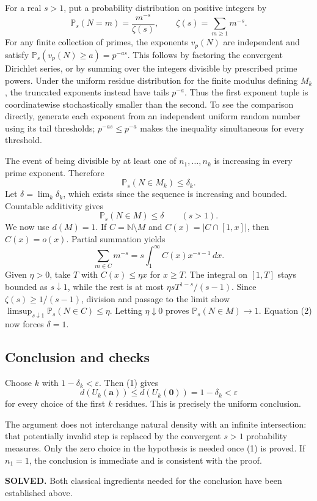 For a real $s>1$, put a probability distribution on positive integers by
\[
 \mathbb P_s(N=m)=\frac{m^{-s}}{\zeta(s)},
 \qquad \zeta(s)=\sum_{m\ge1}m^{-s}.
\]
For any finite collection of primes, the exponents $v_p(N)$ are independent and satisfy
$\mathbb P_s(v_p(N)\ge a)=p^{-as}$. This follows by factoring the convergent Dirichlet series, or by summing over the integers divisible by prescribed prime powers. Under the uniform residue distribution for the finite modulus defining $M_k$, the truncated exponents instead have tails $p^{-a}$. Thus the first exponent tuple is coordinatewise stochastically smaller than the second. To see the comparison directly, generate each exponent from an independent uniform random number using its tail thresholds; $p^{-as}\le p^{-a}$ makes the inequality simultaneous for every threshold.

The event of being divisible by at least one of $n_1,\ldots,n_k$ is increasing in every prime exponent. Therefore
\[
 \mathbb P_s(N\in M_k)\le\delta_k.
\]
Let $\delta=\lim_k\delta_k$, which exists since the sequence is increasing and bounded. Countable additivity gives
\[
 \mathbb P_s(N\in M)\le\delta \qquad(s>1).
 \tag{2}
\]
We now use $d(M)=1$. If $C=\mathbb N\setminus M$ and $C(x)=|C\cap[1,x]|$, then $C(x)=o(x)$. Partial summation yields
\[
 \sum_{m\in C}m^{-s}=s\int_1^\infty C(x)x^{-s-1}\,dx.
\]
Given $\eta>0$, take $T$ with $C(x)\le\eta x$ for $x\ge T$. The integral on $[1,T]$ stays bounded as $s\downarrow1$, while the rest is at most $\eta sT^{1-s}/(s-1)$. Since $\zeta(s)\ge1/(s-1)$, division and passage to the limit show
$\limsup_{s\downarrow1}\mathbb P_s(N\in C)\le\eta$. Letting $\eta\downarrow0$ proves $\mathbb P_s(N\in M)\to1$. Equation (2) now forces $\delta=1$.

\subsection{Conclusion and checks}
Choose $k$ with $1-\delta_k<\varepsilon$. Then (1) gives
\[
 d(U_k(\mathbf a))\le d(U_k(\mathbf0))=1-\delta_k<\varepsilon
\]
for every choice of the first $k$ residues. This is precisely the uniform conclusion.

The argument does not interchange natural density with an infinite intersection: that potentially invalid step is replaced by the convergent $s>1$ probability measures. Only the zero choice in the hypothesis is needed once (1) is proved. If $n_1=1$, the conclusion is immediate and is consistent with the proof.

\textbf{SOLVED.} Both classical ingredients needed for the conclusion have been established above.

